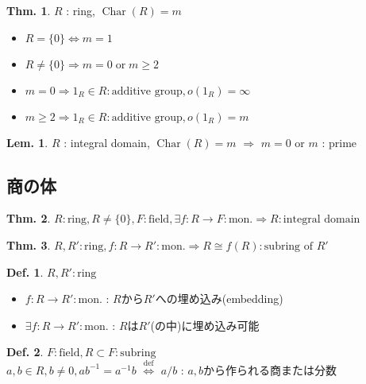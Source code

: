\documentclass[uplatex,dvipdfmx,9pt]{beamer}
\newcommand{\defarrow}{\overset{\mathrm{def}}{\Leftrightarrow}}
\newcommand{\inverse}[1]{#1^{-1}}
\newcommand{\Char}[1]{\operatorname{Char}(#1)}
\newcommand{\mon}{\text{mon.}} %
\newcommand{\sscount}{\textsection \thesubsection}
\newcounter{textLemCount}
\newcounter{textExmCount}
\theoremstyle{definition} %
\newtheorem{defn}{Def.}[subsection] %
\newtheorem{thm}{Thm.}[subsection] %
\newtheorem{lemText}[textLemCount]{Lem.} %
\theoremstyle{example}
\begin{document}
    \begin{frame}

     \begin{thm}
      $R$ : ring, $\Char{R} = m$
      \begin{itemize}
        \item $R = \{0\} \Leftrightarrow m = 1$
        \item $R \neq \{0\} \Rightarrow m = 0 \; \text{or} \; m \ge 2$
        \item $m = 0 \Rightarrow 1_R \in R : \text{additive group}, o(1_R) = \infty$
        \item $m \ge 2 \Rightarrow 1_R \in R : \text{additive group}, o(1_R) = m$
      \end{itemize}
    \end{thm} 

    \begin{lemText}
      $R$ : integral domain, $\Char{R} = m$ $\Rightarrow$ $m = 0$ or $m$ : prime
    \end{lemText}

    \end{frame}

    \subsection{\sscount 商の体}
    \setcounter{textExmCount}{0}

    \begin{frame}

      \begin{thm}
        $R : \text{ring}, R \neq \{0\}, F : \text{field}, \exists f\colon R \to F : \mon \Rightarrow R : \text{integral domain}$
      \end{thm}

      \begin{thm}
        $R, R' : \text{ring}, f\colon R \to R' : \mon \Rightarrow R \cong f(R) : \text{subring of $R'$}$
      \end{thm}

      \begin{defn}
        $R, R' : \text{ring}$
        \begin{itemize}
          \item $f\colon R \to R' : \mon$ : $R$から$R'$への\alert{埋め込み(embedding)}
          \item $\exists f\colon R \to R' : \mon$ : $R$は$R'$(の中)に\alert{埋め込み可能}
        \end{itemize}
      \end{defn}
 
      \begin{defn}
        $F : \text{field}, R \subset F : \text{subring}$ \\
        $a, b \in R, b \neq 0, a\inverse{b} = \inverse{a}b$ $\defarrow$ $a/b$ : $a, b$から作られる商または分数
      \end{defn}
     
    \end{frame}
\end{document}

